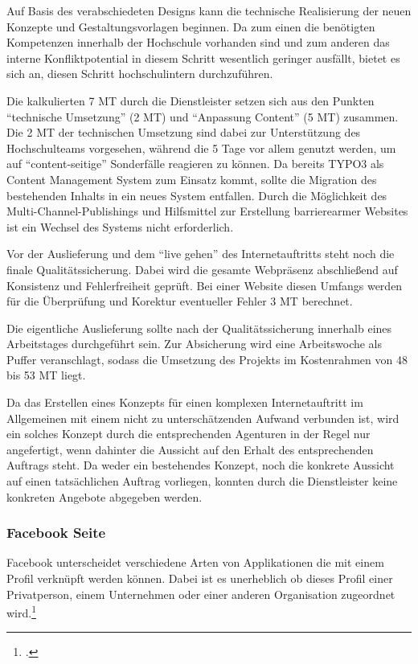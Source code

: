 Auf Basis des verabschiedeten Designs kann die technische Realisierung der neuen Konzepte und Gestaltungsvorlagen beginnen. Da zum einen die benötigten Kompetenzen innerhalb der Hochschule vorhanden sind und zum anderen das interne Konfliktpotential in diesem Schritt wesentlich geringer ausfällt, bietet es sich an, diesen Schritt hochschulintern durchzuführen. 

Die kalkulierten 7 MT durch die Dienstleister setzen sich aus den Punkten “technische Umsetzung” (2 MT) und “Anpassung Content” (5 MT) zusammen. Die 2 MT der technischen Umsetzung sind dabei zur Unterstützung des Hochschulteams vorgesehen, während die 5 Tage vor allem genutzt werden, um auf “content-seitige” Sonderfälle reagieren zu können. Da bereits TYPO3 als Content Management System zum Einsatz kommt, sollte die Migration des bestehenden Inhalts in ein neues System entfallen. Durch die Möglichkeit des Multi-Channel-Publishings und Hilfsmittel zur Erstellung barrierearmer Websites ist ein Wechsel des Systems nicht erforderlich.

Vor der Auslieferung und dem “live gehen” des Internetauftritts steht noch die finale Qualitätssicherung. Dabei wird die gesamte Webpräsenz abschließend auf Konsistenz und Fehlerfreiheit geprüft. Bei einer Website diesen Umfangs werden für die Überprüfung und Korektur eventueller Fehler 3 MT berechnet.

Die eigentliche Auslieferung sollte nach der Qualitätssicherung innerhalb eines Arbeitstages durchgeführt sein. Zur Absicherung wird eine Arbeitswoche als Puffer veranschlagt, sodass die Umsetzung des Projekts im Kostenrahmen von 48 bis 53 MT liegt.

Da das Erstellen eines Konzepts für einen komplexen Internetauftritt im Allgemeinen mit einem nicht zu unterschätzenden Aufwand verbunden ist, wird ein solches Konzept durch die entsprechenden Agenturen in der Regel nur angefertigt, wenn dahinter die Aussicht auf den Erhalt des entsprechenden Auftrags steht. Da weder ein bestehendes Konzept, noch die konkrete Aussicht auf einen tatsächlichen Auftrag vorliegen, konnten durch die Dienstleister keine konkreten Angebote abgegeben werden.

\subsubsection{Facebook Seite}
Facebook unterscheidet verschiedene Arten von Applikationen die mit einem Profil verknüpft werden können. Dabei ist es unerheblich ob dieses Profil einer Privatperson, einem Unternehmen oder einer anderen Organisation zugeordnet wird.\footcite[Vgl.][]{dev_fb_42}

